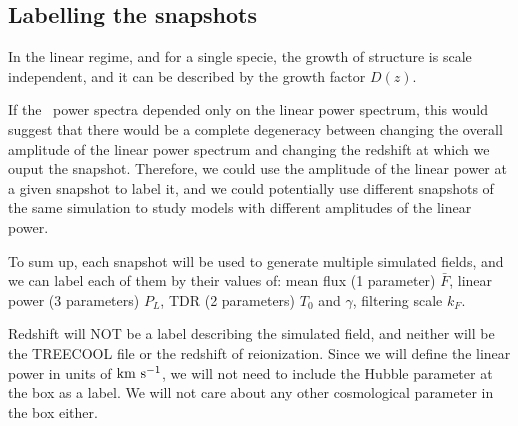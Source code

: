 \subsection{Labelling the snapshots}

In the linear regime, and for a single specie, the growth of structure is 
scale independent, and it can be described by the growth factor $D(z)$.

If the \lya\ power spectra depended only on the linear power spectrum, this 
would suggest that there would be a complete degeneracy between changing 
the overall amplitude of the linear power spectrum and changing the redshift
at which we ouput the snapshot. 
Therefore, we could use the amplitude of the linear power at a given snapshot
to label it, and we could potentially use different snapshots of the same 
simulation to study models with different amplitudes of the linear power. 


To sum up, each snapshot will be used to generate multiple simulated 
fields, and we can label each of them by their values of: 
mean flux (1 parameter) $\bar F$,
linear power (3 parameters) $P_L$,
TDR (2 parameters) $T_0$ and $\gamma$, 
filtering scale $k_F$. 

Redshift will NOT be a label describing the simulated field, and neither
will be the TREECOOL file or the redshift of reionization.
Since we will define the linear power in units of ${\rm km~s^{-1}}$, we will not 
need to include the Hubble parameter at the box as a label.
We will not care about any other cosmological parameter in the box
either.

